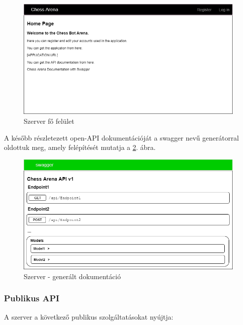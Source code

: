\documentclass[twoside, a4paper, 12pt]{article}
\begin{document}
\begin{figure}[htbp]
	\centering
	\includegraphics[width=1.0\textwidth]{img/serverUiMainScreen.png}
	\caption{Szerver fő felület}
	\label{fig:serverUiMainScreen}
\end{figure}

A később részletezett open-API dokumentációját a swagger nevű generátorral oldottuk meg, amely felépítését mutatja a \ref{fig:serverUiDocumentation}. ábra.

\begin{figure}[htbp]
	\centering
	\includegraphics[width=1.0\textwidth]{img/serverUiDocumentation.png}
	\caption{Szerver - generált dokumentáció}
	\label{fig:serverUiDocumentation}
\end{figure}


\subsubsection{Publikus API}
A szerver a következő publikus szolgáltatásokat nyújtja:
\end{document}
